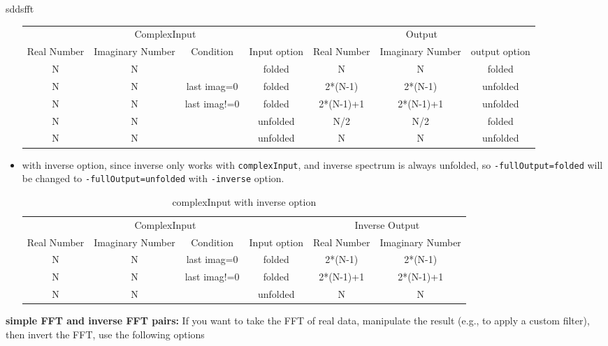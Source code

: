 \begin{sddsprog}{sddsfft}
\begin{itemize}
\begin{table}[hbt]
          \begin{tabular}{|c|c|c|c|c|c|c|}
            \multicolumn{4}{|c|}{ComplexInput} & \multicolumn{3}{|c|}{Output} \\
            Real Number & Imaginary Number & Condition & Input option & Real Number & Imaginary Number & output option \\ \hline
            N & N & & folded & N & N & folded \\ \hline
            N & N & last imag=0 & folded & 2*(N-1) & 2*(N-1) & unfolded \\ \hline
            N & N & last imag!=0 & folded & 2*(N-1)+1 & 2*(N-1)+1 & unfolded \\ \hline
            N & N & & unfolded & N/2 & N/2 & folded \\ \hline
            N & N & & unfolded & N & N & unfolded \\ \hline
          \end{tabular}
          \label{table2}
        \end{table}
      \item with inverse option, since inverse only works with \verb|complexInput|, and inverse spectrum is always unfolded, so \verb|-fullOutput=folded| will be changed to \verb|-fullOutput=unfolded| with \verb|-inverse| option.
        \begin{table}[hbt]
          \caption{complexInput with inverse option}
          \begin{tabular}{|c|c|c|c|c|c|}
            \multicolumn{4}{|c|}{ComplexInput} & \multicolumn{2}{|c|}{Inverse Output} \\
            Real Number & Imaginary Number & Condition & Input option & Real Number & Imaginary Number \\ \hline
            N & N & last imag=0 & folded & 2*(N-1) & 2*(N-1) \\ \hline
            N & N & last imag!=0 & folded & 2*(N-1)+1 & 2*(N-1)+1 \\ \hline
            N & N & & unfolded & N & N \\ \hline
          \end{tabular}
          \label{table3}
        \end{table}
    \end{itemize}
  \item \textbf{simple FFT and inverse FFT pairs:} If you want to take the FFT of real data, manipulate the result (e.g., to apply a custom filter), then invert the FFT, use the following options
    \begin{itemize}

\end{itemize}
\end{sddsprog}
